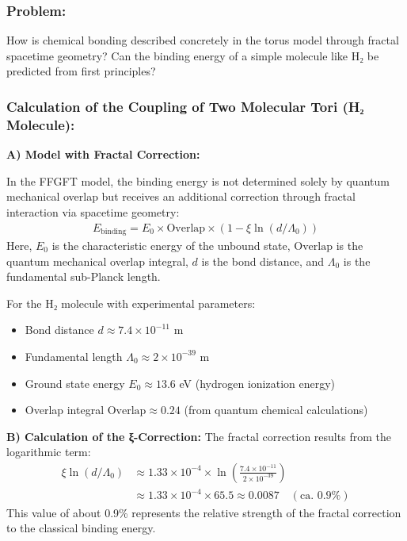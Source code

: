\documentclass[12pt,a4paper]{article}
\begin{document}
	\subsubsection*{Problem:}
	How is chemical bonding described concretely in the torus model through fractal spacetime geometry? Can the binding energy of a simple molecule like H₂ be predicted from first principles?
	
	\subsubsection*{Calculation of the Coupling of Two Molecular Tori (H₂ Molecule):}
	
	\textbf{A) Model with Fractal Correction:}
	
	In the FFGFT model, the binding energy is not determined solely by quantum mechanical overlap but receives an additional correction through fractal interaction via spacetime geometry:
	\begin{align*}
		E_{\text{binding}} = E_0 \times \text{Overlap} \times \left(1 - \xi \ln(d/\Lambda_0)\right)
	\end{align*}
	Here, $E_0$ is the characteristic energy of the unbound state, $\text{Overlap}$ is the quantum mechanical overlap integral, $d$ is the bond distance, and $\Lambda_0$ is the fundamental sub-Planck length.
	
	For the H₂ molecule with experimental parameters:
	\begin{itemize}
		\item Bond distance $d \approx 7.4 \times 10^{-11}$ m
		\item Fundamental length $\Lambda_0 \approx 2 \times 10^{-39}$ m
		\item Ground state energy $E_0 \approx 13.6$ eV (hydrogen ionization energy)
		\item Overlap integral $\text{Overlap} \approx 0.24$ (from quantum chemical calculations)
	\end{itemize}
	
	\textbf{B) Calculation of the ξ-Correction:}
	The fractal correction results from the logarithmic term:
	\begin{align*}
		\xi \ln(d/\Lambda_0) &\approx 1.33 \times 10^{-4} \times \ln\left(\frac{7.4 \times 10^{-11}}{2 \times 10^{-39}}\right) \\
		&\approx 1.33 \times 10^{-4} \times 65.5 \approx 0.0087 \quad (\text{ca. } 0.9\%)
	\end{align*}
	This value of about 0.9\% represents the relative strength of the fractal correction to the classical binding energy.
	
\end{document}
